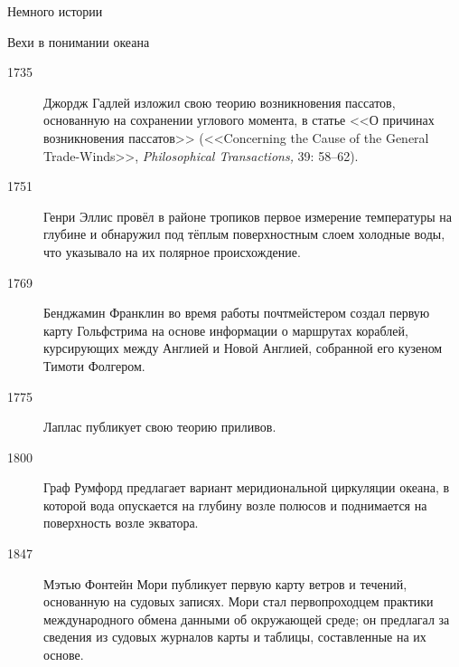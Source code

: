 \begin{chapter}{Немного истории}
\begin{section}{Вехи в понимании океана}
\begin{description}
\item[1735] Джордж Гадлей изложил свою теорию возникновения
пассатов, основанную на сохранении углового момента, в статье
<<О причинах возникновения пассатов>> (<<Concerning the Cause of
the General Trade-Winds>>, \textsl{Philosophical Transactions,} 39: 58--62).
%



\item[1751] Генри Эллис провёл в районе тропиков первое
измерение температуры на глубине и обнаружил под тёплым поверхностным
слоем холодные воды, что указывало на их полярное происхождение.
%

\item[1769] Бенджамин Франклин во время работы почтмейстером 
создал первую карту Гольфстрима на основе информации о маршрутах кораблей, 
курсирующих между Англией и Новой Англией, собранной его кузеном 
Тимоти Фолгером.
%

\item[1775] Лаплас публикует свою теорию приливов.

\item[1800] Граф Румфорд предлагает вариант
меридиональной циркуляции океана, в которой вода опускается на глубину
возле полюсов и поднимается на поверхность возле экватора.
%

\item[1847] Мэтью Фонтейн Мори публикует первую карту ветров и
течений, основанную на судовых записях. Мори стал первопроходцем практики
международного обмена данными об окружающей среде; он предлагал за сведения из 
судовых журналов карты и таблицы, составленные на их основе.
%


\end{description}
\end{section}
\end{chapter}
